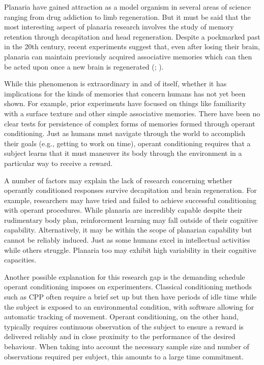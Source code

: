\documentclass[
  jou,
  floatsintext,
  longtable,
  nolmodern,
  notxfonts,
  notimes,
  donotrepeattitle,
  colorlinks=true,linkcolor=blue,citecolor=blue,urlcolor=blue]{apa7}
\begin{document}
Planaria have gained attraction as a model organism in several areas of
science ranging from drug addiction to limb regeneration. But it must be
said that the most interesting aspect of planaria research involves the
study of memory retention through decapitation and head regeneration.
Despite a pockmarked past in the 20th century, recent experiments
suggest that, even after losing their brain, planaria can maintain
previously acquired associative memories which can then be acted upon
once a new brain is regenerated
(;
).

While this phenomenon is extraordinary in and of itself, whether it has
implications for the kinds of memories that concern humans has not yet
been shown. For example, prior experiments have focused on things like
familiarity with a surface texture and other simple associative
memories. There have been no clear tests for persistence of complex
forms of memories formed through operant conditioning. Just as humans
must navigate through the world to accomplish their goals (e.g., getting
to work on time), operant conditioning requires that a subject learns
that it must maneuver its body through the environment in a particular
way to receive a reward.

A number of factors may explain the lack of research concerning whether
operantly conditioned responses survive decapitation and brain
regeneration. For example, researchers may have tried and failed to
achieve successful conditioning with operant procedures. While planaria
are incredibly capable despite their rudimentary body plan,
reinforcement learning may fall outside of their cognitive capability.
Alternatively, it may be within the scope of planarian capability but
cannot be reliably induced. Just as some humans excel in intellectual
activities while others struggle. Planaria too may exhibit high
variability in their cognitive capacities.

Another possible explanation for this research gap is the demanding
schedule operant conditioning imposes on experimenters. Classical
conditioning methods such as CPP often require a brief set up but then
have periods of idle time while the subject is exposed to an
environmental condition, with software allowing for automatic tracking
of movement. Operant conditioning, on the other hand, typically requires
continuous observation of the subject to ensure a reward is delivered
reliably and in close proximity to the performance of the desired
behaviour. When taking into account the necessary sample size and number
of observations required per subject, this amounts to a large time
commitment.
\end{document}
